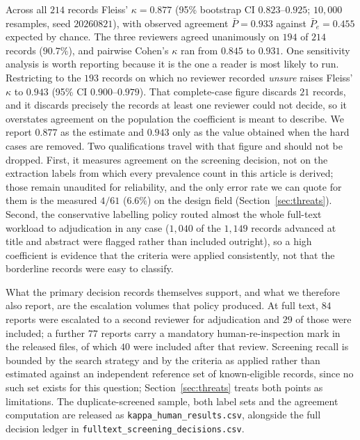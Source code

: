 \documentclass[review,authoryear]{elsarticle}
\begin{document}
Across all $214$ records Fleiss' $\kappa = 0.877$ (95\% bootstrap CI $0.823$--$0.925$;
$10{,}000$ resamples, seed $20260821$), with observed agreement $\bar{P} = 0.933$ against
$\bar{P}_e = 0.455$ expected by chance. The three reviewers agreed unanimously on $194$
of $214$ records ($90.7\%$), and pairwise Cohen's $\kappa$ ran from $0.845$ to $0.931$.
One sensitivity analysis is worth reporting because it is the one a reader is most likely
to run. Restricting to the $193$ records on which no reviewer recorded \emph{unsure}
raises Fleiss' $\kappa$ to $0.943$ (95\% CI $0.900$--$0.979$). That complete-case figure
discards $21$ records, and it discards precisely the records at least one reviewer could
not decide, so it overstates agreement on the population the coefficient is meant to
describe. We report $0.877$ as the estimate and $0.943$ only as the value obtained when
the hard cases are removed.
Two qualifications travel with that figure and should not be dropped. First, it measures
agreement on the screening decision, not on the extraction labels from which every
prevalence count in this article is derived; those remain unaudited for reliability, and
the only error rate we can quote for them is the measured $4/61$ ($6.6\%$) on the design
field (Section~\ref{sec:threats}). Second, the conservative labelling policy routed
almost the whole full-text workload to adjudication in any case ($1{,}040$ of the
$1{,}149$ records advanced at title and abstract were flagged rather than included
outright), so a high coefficient is evidence that the criteria were applied
consistently, not that the borderline records were easy to classify.

What the primary decision records themselves support, and what we therefore also report,
are the escalation volumes that policy produced. At full text, $84$ reports were
escalated to a second reviewer for adjudication and $29$ of those were included; a
further $77$ reports carry a mandatory human-re-inspection mark in the released files,
of which $40$ were included after that review. Screening recall is bounded by the search
strategy and by the criteria as applied rather than estimated against an independent
reference set of known-eligible records, since no such set exists for this question;
Section~\ref{sec:threats} treats both points as limitations. The duplicate-screened
sample, both label sets and the agreement computation are released as
\texttt{kappa\_human\_results.csv}, alongside the full decision ledger in
\texttt{fulltext\_screening\_decisions.csv}.
\end{document}
